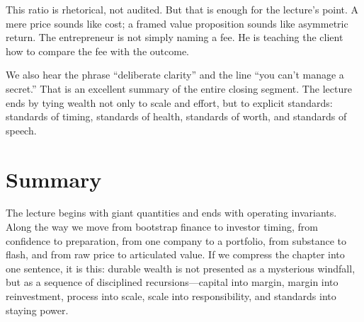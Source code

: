 This ratio is rhetorical, not audited. But that is enough for the lecture's point. A mere price sounds like cost; a framed value proposition sounds like asymmetric return. The entrepreneur is not simply naming a fee. He is teaching the client how to compare the fee with the outcome.

We also hear the phrase ``deliberate clarity'' and the line ``you can't manage a secret.'' That is an excellent summary of the entire closing segment. The lecture ends by tying wealth not only to scale and effort, but to explicit standards: standards of timing, standards of health, standards of worth, and standards of speech.

\section{Summary}

The lecture begins with giant quantities and ends with operating invariants. Along the way we move from bootstrap finance to investor timing, from confidence to preparation, from one company to a portfolio, from substance to flash, and from raw price to articulated value. If we compress the chapter into one sentence, it is this: durable wealth is not presented as a mysterious windfall, but as a sequence of disciplined recursions---capital into margin, margin into reinvestment, process into scale, scale into responsibility, and standards into staying power.